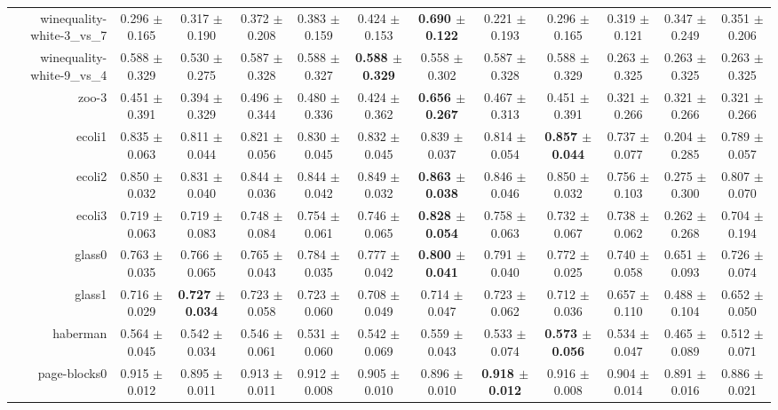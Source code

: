 \begin{table}[!ht]
{\begin{tabular}{r c c c c c c c c c c c}
winequality-white-3\_vs\_7 & 0.296 $\pm$ 0.165 & 0.317 $\pm$ 0.190 & 0.372 $\pm$ 0.208 & 0.383 $\pm$ 0.159 & 0.424 $\pm$ 0.153 & \textbf{0.690 $\pm$ 0.122} & 0.221 $\pm$ 0.193 & 0.296 $\pm$ 0.165 & 0.319 $\pm$ 0.121 & 0.347 $\pm$ 0.249 & 0.351 $\pm$ 0.206 \\
winequality-white-9\_vs\_4 & 0.588 $\pm$ 0.329 & 0.530 $\pm$ 0.275 & 0.587 $\pm$ 0.328 & 0.588 $\pm$ 0.327 & \textbf{0.588 $\pm$ 0.329} & 0.558 $\pm$ 0.302 & 0.587 $\pm$ 0.328 & 0.588 $\pm$ 0.329 & 0.263 $\pm$ 0.325 & 0.263 $\pm$ 0.325 & 0.263 $\pm$ 0.325 \\
zoo-3 & 0.451 $\pm$ 0.391 & 0.394 $\pm$ 0.329 & 0.496 $\pm$ 0.344 & 0.480 $\pm$ 0.336 & 0.424 $\pm$ 0.362 & \textbf{0.656 $\pm$ 0.267} & 0.467 $\pm$ 0.313 & 0.451 $\pm$ 0.391 & 0.321 $\pm$ 0.266 & 0.321 $\pm$ 0.266 & 0.321 $\pm$ 0.266 \\
ecoli1 & 0.835 $\pm$ 0.063 & 0.811 $\pm$ 0.044 & 0.821 $\pm$ 0.056 & 0.830 $\pm$ 0.045 & 0.832 $\pm$ 0.045 & 0.839 $\pm$ 0.037 & 0.814 $\pm$ 0.054 & \textbf{0.857 $\pm$ 0.044} & 0.737 $\pm$ 0.077 & 0.204 $\pm$ 0.285 & 0.789 $\pm$ 0.057 \\
ecoli2 & 0.850 $\pm$ 0.032 & 0.831 $\pm$ 0.040 & 0.844 $\pm$ 0.036 & 0.844 $\pm$ 0.042 & 0.849 $\pm$ 0.032 & \textbf{0.863 $\pm$ 0.038} & 0.846 $\pm$ 0.046 & 0.850 $\pm$ 0.032 & 0.756 $\pm$ 0.103 & 0.275 $\pm$ 0.300 & 0.807 $\pm$ 0.070 \\
ecoli3 & 0.719 $\pm$ 0.063 & 0.719 $\pm$ 0.083 & 0.748 $\pm$ 0.084 & 0.754 $\pm$ 0.061 & 0.746 $\pm$ 0.065 & \textbf{0.828 $\pm$ 0.054} & 0.758 $\pm$ 0.063 & 0.732 $\pm$ 0.067 & 0.738 $\pm$ 0.062 & 0.262 $\pm$ 0.268 & 0.704 $\pm$ 0.194 \\
glass0 & 0.763 $\pm$ 0.035 & 0.766 $\pm$ 0.065 & 0.765 $\pm$ 0.043 & 0.784 $\pm$ 0.035 & 0.777 $\pm$ 0.042 & \textbf{0.800 $\pm$ 0.041} & 0.791 $\pm$ 0.040 & 0.772 $\pm$ 0.025 & 0.740 $\pm$ 0.058 & 0.651 $\pm$ 0.093 & 0.726 $\pm$ 0.074 \\
glass1 & 0.716 $\pm$ 0.029 & \textbf{0.727 $\pm$ 0.034} & 0.723 $\pm$ 0.058 & 0.723 $\pm$ 0.060 & 0.708 $\pm$ 0.049 & 0.714 $\pm$ 0.047 & 0.723 $\pm$ 0.062 & 0.712 $\pm$ 0.036 & 0.657 $\pm$ 0.110 & 0.488 $\pm$ 0.104 & 0.652 $\pm$ 0.050 \\
haberman & 0.564 $\pm$ 0.045 & 0.542 $\pm$ 0.034 & 0.546 $\pm$ 0.061 & 0.531 $\pm$ 0.060 & 0.542 $\pm$ 0.069 & 0.559 $\pm$ 0.043 & 0.533 $\pm$ 0.074 & \textbf{0.573 $\pm$ 0.056} & 0.534 $\pm$ 0.047 & 0.465 $\pm$ 0.089 & 0.512 $\pm$ 0.071 \\
page-blocks0 & 0.915 $\pm$ 0.012 & 0.895 $\pm$ 0.011 & 0.913 $\pm$ 0.011 & 0.912 $\pm$ 0.008 & 0.905 $\pm$ 0.010 & 0.896 $\pm$ 0.010 & \textbf{0.918 $\pm$ 0.012} & 0.916 $\pm$ 0.008 & 0.904 $\pm$ 0.014 & 0.891 $\pm$ 0.016 & 0.886 $\pm$ 0.021 \\

\end{tabular}}
\end{table}
